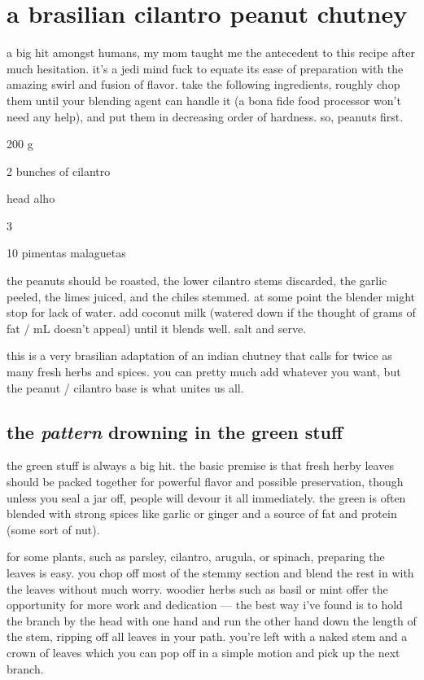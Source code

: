 \section{a brasilian cilantro peanut chutney}

a big hit amongst humans, my mom taught me the antecedent to this recipe after 
much hesitation. it's a jedi mind fuck to equate its ease of preparation with 
the amazing swirl and fusion of flavor. take the following ingredients, roughly 
chop them until your blending agent can handle it (a bona fide food processor 
won't need any help), and put them in decreasing order of hardness. so, peanuts 
first.

\begin{ingredients}
  \item 200 g 
  \item 2 bunches of cilantro
  \item \onehalf head \gls{alho}
  \item 3 
  \item 10 \gls{pimentas malaguetas}
\end{ingredients}

the peanuts should be roasted, the lower cilantro stems discarded, the garlic 
peeled, the limes juiced, and the chiles stemmed. at some point the blender 
might stop for lack of water. add coconut milk (watered down if the thought of 
 grams of fat / mL doesn't appeal) until it blends well. salt and serve.

this is a very brasilian adaptation of an indian chutney that calls for twice 
as many fresh herbs and spices. you can pretty much add whatever you want, but 
the peanut / cilantro base is what unites us all.

\subsection{the \textit{pattern} drowning in the green stuff}

the green stuff is always a big hit. the basic premise is that fresh herby 
leaves should be packed together for powerful flavor and possible preservation, 
though unless you seal a jar off, people will devour it all immediately. the 
green is often blended with strong spices like garlic or ginger and a source of 
fat and protein (some sort of nut).

for some plants, such as parsley, cilantro, arugula, or spinach, preparing the 
leaves is easy. you chop off most of the stemmy section and blend the rest in 
with the leaves without much worry. woodier herbs such as basil or mint offer 
the opportunity for more work and dedication --- the best way i've found is to 
hold the branch by the head with one hand and run the other hand down the 
length of the stem, ripping off all leaves in your path. you're left with a 
naked stem and a crown of leaves which you can pop off in a simple motion and 
pick up the next branch.

